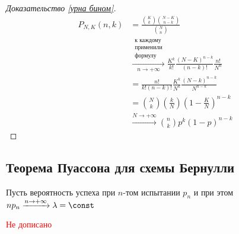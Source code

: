 \documentclass[12pt, a4paper, oneside]{book}
\begin{document}
\begin{proof}[Доказательство \ref{урна бином}]
    \begin{align*}
        P_{N, K}(n, k) & = \frac{\binom{K}{k} \binom{N - K}{n - k}}{\binom{N}{n}}                         \\
                       & \xrightarrow[n \to +\infty]{\substack{\text{к каждому}                           \\ \text{применили} \\ \text{формулу}}} \frac{K^k}{k!} \frac{(N-K)^{n-k}}{(n-k)!} \frac{n!}{N^n}   \\
                       & = \frac{n!}{k!(n - k)!} \frac{K^k}{N^k} \frac{(N - k)^{n - k}}{N^{n - k}}        \\
                       & = \binom{N}{k} \left( \frac{k}{N} \right) \left( 1 - \frac{K}{N} \right)^{n - k} \\
                       & \xrightarrow{N \to +\infty} \binom{n}{k} p^k (1 - p)^{n - k}
    \end{align*}
\end{proof}

\subsection{Теорема Пуассона для схемы Бернулли}

Пусть вероятность успеха при \(n\)-том испытании \(p_n\) и при этом \(n p_n\xrightarrow{n \to +\infty}\lambda =\const\)

\textcolor{red}{Не дописано}
\end{document}
